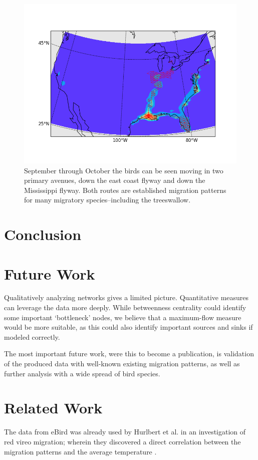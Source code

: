 \documentclass{article} %
\begin{document}
\begin{figure}[ht]
\centering
\includegraphics[width=.9\textwidth]{../code/swallowpics/bird38.png}
\caption{September through October the birds can be seen moving in two primary avenues, down the east coast flyway and down the Mississippi flyway.  Both routes are established migration patterns for many migratory species--including the treeswallow.}
\label{figBidLouisiana}
\end{figure}

\section{Conclusion}


\section{Future Work}
Qualitatively analyzing networks gives a limited picture. Quantitative measures can leverage the data more deeply. While betweenness centrality could identify some important `bottleneck' nodes, we believe that a maximum-flow measure would be more suitable, as this could also identify important sources and sinks if modeled correctly.

The most important future work, were this to become a publication, is validation of the produced data with well-known existing migration patterns, as well as further analysis with a wide spread of bird species.

\section{Related Work}
The data from eBird was already used by Hurlbert et al. in an investigation of red vireo migration; wherein they discovered a direct correlation between the migration patterns and the average temperature \cite{hurlbert}. 
\end{document}
